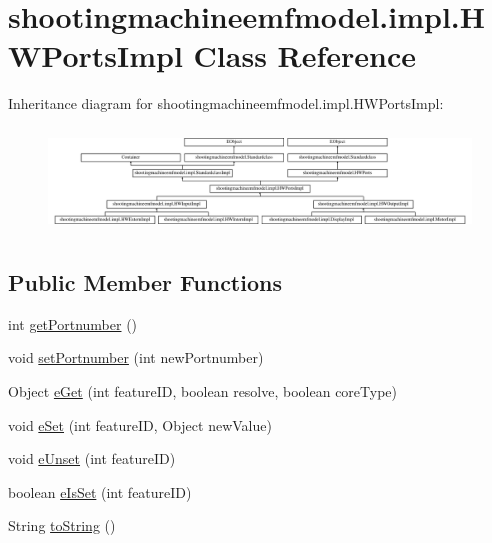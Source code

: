 \hypertarget{classshootingmachineemfmodel_1_1impl_1_1_h_w_ports_impl}{\section{shootingmachineemfmodel.\-impl.\-H\-W\-Ports\-Impl Class Reference}
\label{classshootingmachineemfmodel_1_1impl_1_1_h_w_ports_impl}
}
Inheritance diagram for shootingmachineemfmodel.\-impl.\-H\-W\-Ports\-Impl\-:\begin{figure}[H]
\begin{center}
\leavevmode
\includegraphics[height=2.809365cm]{classshootingmachineemfmodel_1_1impl_1_1_h_w_ports_impl}
\end{center}
\end{figure}
\subsection*{Public Member Functions}
\begin{DoxyCompactItemize}
\item 
int \hyperlink{classshootingmachineemfmodel_1_1impl_1_1_h_w_ports_impl_a097170781924f6c67ddfb46893fc67bb}{get\-Portnumber} ()
\item 
void \hyperlink{classshootingmachineemfmodel_1_1impl_1_1_h_w_ports_impl_a40d7b9200e07dfa30718e81fdfac76aa}{set\-Portnumber} (int new\-Portnumber)
\item 
Object \hyperlink{classshootingmachineemfmodel_1_1impl_1_1_h_w_ports_impl_a1f316c0547aef128f31e0eb7fa591861}{e\-Get} (int feature\-I\-D, boolean resolve, boolean core\-Type)
\item 
void \hyperlink{classshootingmachineemfmodel_1_1impl_1_1_h_w_ports_impl_a744180088a1e07c0dd63949054caab21}{e\-Set} (int feature\-I\-D, Object new\-Value)
\item 
void \hyperlink{classshootingmachineemfmodel_1_1impl_1_1_h_w_ports_impl_a8b0f20f3c28915c1b0a80a72f654c1cc}{e\-Unset} (int feature\-I\-D)
\item 
boolean \hyperlink{classshootingmachineemfmodel_1_1impl_1_1_h_w_ports_impl_ae0e0133c9597b1d36e1dde2e4c71c670}{e\-Is\-Set} (int feature\-I\-D)
\item 
String \hyperlink{classshootingmachineemfmodel_1_1impl_1_1_h_w_ports_impl_a875d2e3d22be7abf18ca633334ef2848}{to\-String} ()
\end{DoxyCompactItemize}
